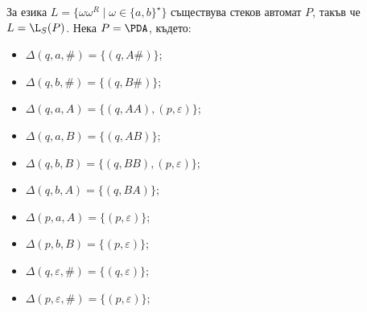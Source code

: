 \begin{example}
  За езика $L = \{\omega\omega^R \mid \omega \in \{a,b\}^\star\}$ съществува стеков автомат $P$, такъв че
  $L = \L_S(P)$.  
  Нека $P = \PDA$, където:
  \begin{itemize}
  \item 
    $\Delta(q, a, \#) = \{(q, A\#)\}$;
  \item 
    $\Delta(q, b, \#) = \{(q, B\#)\}$;
  \item
    $\Delta(q, a, A) = \{(q, AA), (p, \varepsilon)\}$;
  \item
    $\Delta(q, a, B) = \{(q, AB)\}$;
  \item
    $\Delta(q, b, B) = \{(q, BB), (p, \varepsilon)\}$;
  \item
    $\Delta(q, b, A) = \{(q, BA)\}$;
  \item
    $\Delta(p, a, A) = \{(p,\varepsilon)\}$;
  \item
    $\Delta(p, b, B) = \{(p,\varepsilon)\}$;
  \item
    $\Delta(q, \varepsilon, \#) = \{(q,\varepsilon)\}$;
  \item
    $\Delta(p, \varepsilon, \#) = \{(p,\varepsilon)\}$;
  \end{itemize}
\end{example}


